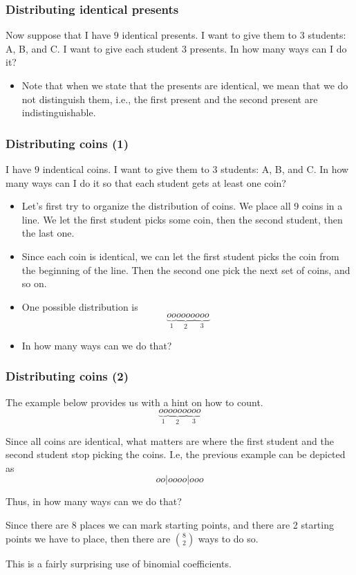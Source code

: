 \begin{frame}\frametitle{Distributing identical presents}
  \begin{tcolorbox}
    Now suppose that I have $9$ identical presents.  I want to give
    them to $3$ students: A, B, and C.  I want to give each student
    $3$ presents.  In how many ways can I do it?
  \end{tcolorbox}
  \begin{itemize}
  \item Note that when we state that the presents are identical, we
    mean that we do not distinguish them, i.e., the first present and
    the second present are indistinguishable.
  \end{itemize}
  \vspace{1in}
\end{frame}

\begin{frame}\frametitle{Distributing coins (1)}
  \begin{tcolorbox}
    I have $9$ indentical coins.  I want to give them to $3$ students:
    A, B, and C.  In how many ways can I do it so that each student
    gets at least one coin?
  \end{tcolorbox}

  \begin{itemize}
  \item Let's first try to organize the distribution of coins.  \pause
    We place all 9 coins in a line.  We let the first student picks
    some coin, then the second student, then the last one. \pause
  \item Since each coin is identical, we can let the first student
    picks the coin from the beginning of the line.  Then the second
    one pick the next set of coins, and so on. \pause
  \item One possible distribution is
    \[
    \underbrace{o o}_{1} \underbrace{o o o o}_{2} \underbrace{o o o}_{3}
    \]
    \pause
  \item In how many ways can we do that?
  \end{itemize}
\end{frame}

\begin{frame}\frametitle{Distributing coins (2)}
  The example below provides us with a hint on how to count.
  \[
  \underbrace{o o}_{1} \underbrace{o o o o}_{2} \underbrace{o o o}_{3}
  \]
  \pause

  Since all coins are identical, what matters are where the first
  student and the second student stop picking the coins. \pause
  I.e, the previous example can be depicted as
  \[
  o o | o o o o | o o o
  \]

  Thus, in how many ways can we do that? \pause
  
  Since there are 8 places we can mark starting points, and
  there are 2 starting points we have to place, then there are
  $\binom{8}{2}$ ways to do so. \pause

  This is a fairly surprising use of binomial coefficients.
\end{frame}

